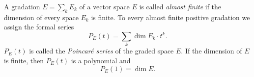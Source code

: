 A gradation $E = \sum_k E_k$ of a vector space $E$ is called \textit{almost finite} if the dimension of every space $E_k$ is finite. To every almost finite positive gradation we assign the formal series
$$P_E(t) = \sum_k \dim E_k \cdot t^k.$$
$P_E(t)$ is called the \textit{Poincaré series} of the graded space $E$. If the dimension of $E$ is finite, then $P_E(t)$ is a polynomial and
$$P_E(1) = \dim E.$$
